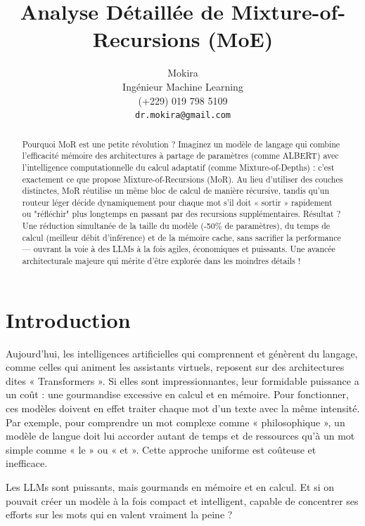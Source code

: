 \documentclass{article}
\title{Analyse Détaillée de Mixture-of-Recursions (MoE)}
\author{
 Mokira \\
  Ingénieur Machine Learning \\
  (+229) 019 798 5109 \\
  \texttt{dr.mokira@gmail.com} \\
}
\begin{document}
\maketitle
\begin{abstract}
Pourquoi MoR est une petite révolution ?
Imaginez un modèle de langage qui combine l’efficacité mémoire
des architectures à partage de paramètres (comme ALBERT) avec l’intelligence
computationnelle du calcul adaptatif (comme Mixture-of-Depths) :
c’est exactement ce que propose Mixture-of-Recursions (MoR).
Au lieu d’utiliser des couches distinctes, MoR réutilise un même bloc
de calcul de manière récursive, tandis qu’un routeur léger décide
dynamiquement pour chaque mot s’il doit « sortir » rapidement ou "réfléchir"
plus longtemps en passant par des recursions supplémentaires. Résultat ?
Une réduction simultanée de la taille du modèle (-50\% de paramètres),
du temps de calcul (meilleur débit d’inférence) et de la mémoire cache,
sans sacrifier la performance --- ouvrant la voie à des LLMs à la fois agiles,
économiques et puissants. Une avancée architecturale majeure qui mérite
d’être explorée dans les moindres détails !
\end{abstract}




\section{Introduction}
Aujourd'hui, les intelligences artificielles qui comprennent et génèrent
du langage, comme celles qui animent les assistants virtuels, reposent
sur des architectures dites « Transformers ». Si elles sont impressionnantes,
leur formidable puissance a un coût : une gourmandise excessive en calcul
et en mémoire. Pour fonctionner, ces modèles doivent en effet traiter
chaque mot d'un texte avec la même intensité. Par exemple, pour comprendre
un mot complexe comme « philosophique », un modèle de langue doit lui accorder
autant de temps et de ressources qu’à un mot simple comme « le » ou « et ».
Cette approche uniforme est coûteuse et inefficace.

Les LLMs sont puissants, mais gourmands en mémoire et en calcul.
Et si on pouvait créer un modèle à la fois compact et intelligent,
capable de concentrer ses efforts sur les mots qui en valent vraiment
la peine ?
\end{document}

